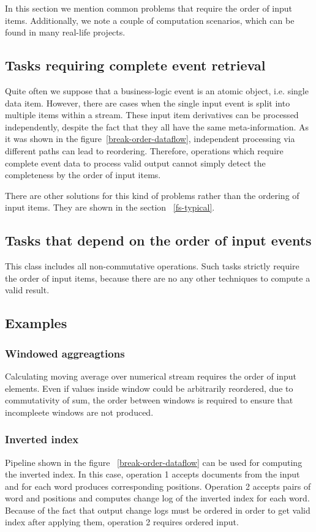 
\label {fs-tasks}

In this section we mention common problems that require the order of input items. Additionally, we note a couple of computation scenarios, which can be found in many real-life projects.

\subsection{Tasks requiring complete event retrieval}
Quite often we suppose that a business-logic event is an atomic object, i.e. single data item. However, there are cases when the single input event is split into multiple items within a stream. These input item derivatives can be processed independently, despite the fact that they all have the same meta-information. As it was shown in the figure~\ref{break-order-dataflow}, independent processing via different paths can lead to reordering. Therefore, operations which require complete event data to process valid output cannot simply detect the completeness by the order of input items.

There are other solutions for this kind of problems rather than the ordering of input items. They are shown in the section ~\ref{fs-typical}. 

\subsection{Tasks that depend on the order of input events}
This class includes all non-commutative operations. Such tasks strictly require the order of input items, because there are no any other techniques to compute a valid result.

\subsection{Examples}

\subsubsection{Windowed aggreagtions}
Calculating moving average over numerical stream requires the order of input elements. Even if values inside window could be arbitrarily reordered, due to commutativity of sum, the order between windows is required to ensure that incompleete windows are not produced.

\subsubsection{Inverted index}
Pipeline shown in the figure ~\ref{break-order-dataflow} can be used for computing the inverted index. In this case, operation 1 accepts documents from the input and for each word produces corresponding positions. Operation 2 accepts pairs of word and positions and computes change log of the inverted index for each word. Because of the fact that output change logs must be ordered in order to get valid index after applying them, operation 2 requires ordered input. 

